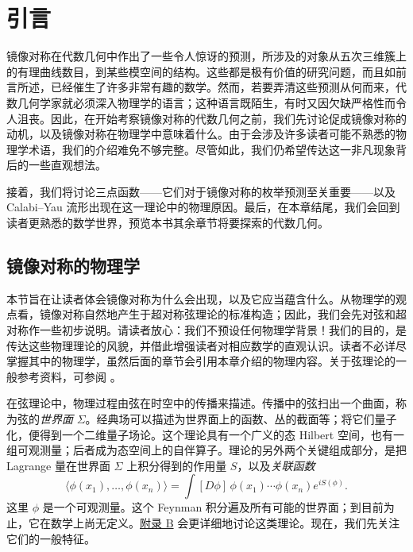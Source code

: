 \chapter{引言}\label{chap:introduction}

镜像对称在代数几何中作出了一些令人惊讶的预测，所涉及的对象从五次三维簇上的有理曲线数目，到某些模空间的结构。这些都是极有价值的研究问题，而且如前言所述，已经催生了许多非常有趣的数学。然而，若要弄清这些预测从何而来，代数几何学家就必须深入物理学的语言；这种语言既陌生，有时又因欠缺严格性而令人沮丧。因此，在开始考察镜像对称的代数几何之前，我们先讨论促成镜像对称的动机，以及镜像对称在物理学中意味着什么。由于会涉及许多读者可能不熟悉的物理学术语，我们的介绍难免不够完整。尽管如此，我们仍希望传达这一非凡现象背后的一些直观想法。

接着，我们将讨论三点函数——它们对于镜像对称的枚举预测至关重要——以及 Calabi--Yau 流形出现在这一理论中的物理原因。最后，在本章结尾，我们会回到读者更熟悉的数学世界，预览本书其余章节将要探索的代数几何。

\section{镜像对称的物理学}\label{sec:physics}

本节旨在让读者体会镜像对称为什么会出现，以及它应当蕴含什么。从物理学的观点看，镜像对称自然地产生于超对称弦理论的标准构造；因此，我们会先对弦和超对称作一些初步说明。请读者放心：我们不预设任何物理学背景！我们的目的，是传达这些物理理论的风貌，并借此增强读者对相应数学的直观认识。读者不必详尽掌握其中的物理学，虽然后面的章节会引用本章介绍的物理内容。关于弦理论的一般参考资料，可参阅 。

在弦理论中，物理过程由弦在时空中的传播来描述。传播中的弦扫出一个曲面，称为弦的\emph{世界面} $\Sigma$。经典场可以描述为世界面上的函数、丛的截面等；将它们量子化，便得到一个二维量子场论。这个理论具有一个广义的态 Hilbert 空间，也有一组可观测量；后者成为态空间上的自伴算子。理论的另外两个关键组成部分，是把 Lagrange 量在世界面 $\Sigma$ 上积分得到的作用量 $S$，以及\emph{关联函数}
\begin{equation}\label{eq:correlation}
 \bigl\langle\phi(x_1),\ldots,\phi(x_n)\bigr\rangle
 =\int[D\phi]\,\phi(x_1)\cdots\phi(x_n)e^{iS(\phi)}.
\end{equation}
这里 $\phi$ 是一个可观测量。这个 Feynman 积分遍及所有可能的世界面；到目前为止，它在数学上尚无定义。\hyperref[app:physical-theories]{附录 B} 会更详细地讨论这类理论。现在，我们先关注它们的一般特征。

